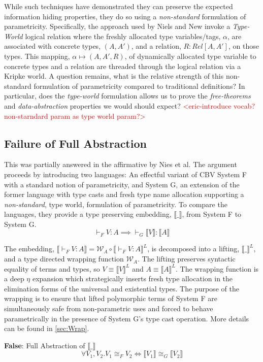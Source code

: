 \documentclass[acmsmall]{acmart}
\newcommand{\den}[1]{\llbracket #1\rrbracket}
\newcommand{\eric}[1]{\textcolor{red}{ <eric-#1> }}
\begin{document}
While such techniques have demonstrated they can preserve the expected information hiding properties, they do so using a \textit{non-standard} formulation of parametricity. Specifically, the approach used by Niels\cite{NonParam} and New\cite{GradParam} invoke a \textit{Type-World} logical relation where the freshly allocated type variables/tags, $\alpha$, are associated with concrete types, $(A,A')$, and a relation, $R : Rel[A,A']$, on those types. This mapping, $\alpha \mapsto (A,A',R)$, of dynamically allocated type variable to concrete types and a relation are threaded through the logical relation via a Kripke world. A question remains, what is the relative strength of this non-standard formulation of parametricity compared to traditional definitions? In particular, does the \textit{type-world} formulation allows us to prove the \textit{free-theorems} and \textit{data-abstraction} properties we would should expect?\eric{introduce vocab? non-starndard param as type world param?}

\subsection{Failure of Full Abstraction}
This was partially answered in the affirmative by Nies et al\cite{NonParam}. The argument proceeds by introducing two languages: An effectful variant of CBV System F with a standard notion of parametricity, and System G, an extension of the former language with type casts and fresh type name allocation supporting a \textit{non-standard}, type world, formulation of parametricity.
To compare the languages, they provide a type preserving embedding, $\den{\_}$, from System F to System G. 
  $$\vdash_F V : A \implies \vdash_G \den{V} : \den{A}$$

The embedding, $\den{\vdash_F V:A} = \mathcal{W}_{A} \circ \den{\vdash_F V:A}^L$, is decomposed into a lifting, $\den{\_}^L$, and a type directed wrapping function $\mathcal{W}_A$. The lifting preserves syntactic equality of terms and types, so $V \equiv \den{V}^L$ and $A \equiv \den{A}^L$. The wrapping function is a deep $\eta$ expansion which strategically inserts fresh type allocation in the elimination forms of the universal and existential types. The purpose of the wrapping is to ensure that lifted polymorphic terms of System F are simultaneously safe from non-parametric uses and forced to behave parametrically in the presence of System G's type cast operation. More details can be found in \cref{sec:Wrap}. 

\begin{conjecture}
  \textbf{False}: Full Abstraction of $\den{\_}$
  $$\forall V_1,V_2. V_1\cong_F V_2 \iff \den{V_1} \cong_G \den{V_2}$$
\end{conjecture}
\end{document}
